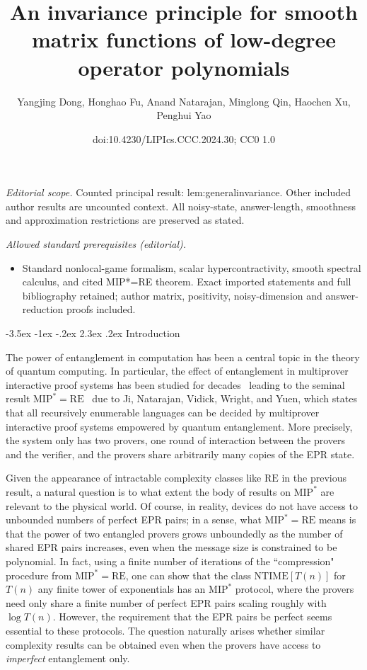 \documentclass[10pt,a4paper]{article}
\title{An invariance principle for smooth matrix functions of low-degree operator polynomials}
\author{Yangjing Dong, Honghao Fu, Anand Natarajan, Minglong Qin, Haochen Xu, Penghui Yao}
\date{doi:10.4230/LIPIcs.CCC.2024.30; CC0 1.0}
\makeatletter
\renewcommand{\section}{\@startsection {section}{1}{\z@}%
             {-3.5ex \@plus -1ex \@minus -.2ex}%
             {2.3ex \@plus .2ex}%
             {\normalfont\Large\scshape\bfseries}}
\theoremstyle{plain}
\theoremstyle{definition}
\newcommand{\1}{\mathbb{1}} %
\newcommand{\MIP}{\mathrm{MIP}}
\newcommand{\RE}{\mathrm{RE}}
\makeatother
\begin{document}
\maketitle
\noindent\textit{Editorial scope.} Counted principal result: lem:generalinvariance. Other included author results are uncounted context. All noisy-state, answer-length, smoothness and approximation restrictions are preserved as stated.\par\medskip
\noindent\textit{Allowed standard prerequisites (editorial).}\begin{itemize}
\item Standard nonlocal-game formalism, scalar hypercontractivity, smooth spectral calculus, and cited MIP*=RE theorem. Exact imported statements and full bibliography retained; author matrix, positivity, noisy-dimension and answer-reduction proofs included.
\end{itemize}\medskip
 \section{Introduction}

The power of entanglement in computation has been a central topic in the theory of quantum computing. In particular, the effect of entanglement in multiprover interactive proof systems has been studied for decades~\cite{doi:10.1137/090772885,doi:10.1137/090751293,Ito:2009:OTO:1602931.1603187,Ji:2017:CQM:3055399.3055441,Slo:2020,slofstra:2019}  leading to the seminal result $\mathrm{MIP}^*=\mathrm{RE}$~\cite{JNVWYuen'20,JNVWY'20} due to Ji, Natarajan, Vidick, Wright, and Yuen, which states that all recursively enumerable languages can be decided by multiprover interactive proof systems empowered by quantum entanglement. More precisely, the system only has two provers, one round of interaction between the provers and the verifier, and the provers share arbitrarily many copies of the EPR state.



Given the appearance of intractable complexity classes like $\RE$ in the previous result, a natural question is to what extent the body of results on $\MIP^*$ are relevant to the physical world. Of course, in reality, devices do not have access to unbounded numbers of perfect EPR pairs; in a sense, what $\MIP^* = \RE$ means is that the power of two entangled provers grows unboundedly as the number of shared EPR pairs increases, even when the message size is constrained to be polynomial. In fact, using a finite number of iterations of the ``compression" procedure from $\MIP^* = \RE$, one can show that the class $\mathrm{NTIME}[T(n)]$ for $T(n)$ any finite tower of exponentials has an $\MIP^*$ protocol, where the provers need only share a finite number of perfect EPR pairs scaling roughly with $\log T(n)$. However, the requirement that the EPR pairs be perfect seems essential to these protocols. The question naturally arises whether similar complexity results can be obtained even when the provers have access to \emph{imperfect} entanglement only.
\end{document}
